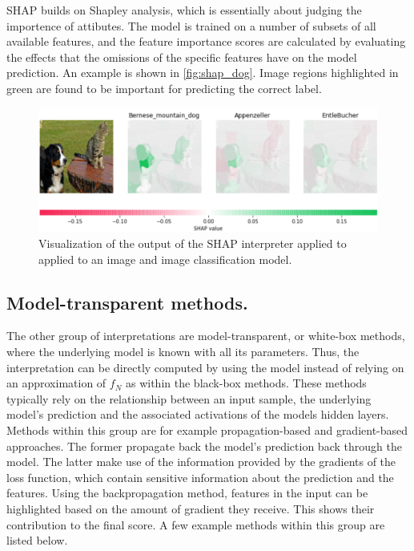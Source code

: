  SHAP \cite{lundberg2017unified} builds on Shapley analysis, which is essentially about judging the importence of attibutes. The model is trained on a number of subsets of all available features, and the feature importance scores are calculated by evaluating the effects that the omissions of the specific features have on the model prediction. An example is shown in \autoref{fig:shap_dog}. Image regions highlighted in green are found to be important for predicting the correct label.

\begin{figure}[ht]
  \centering
  \includegraphics[width=\linewidth]{figures/cat_dog_shap.png}
  \caption{Visualization of the output of the SHAP interpreter applied to applied to an image and image classification model.}\label{fig:shap_dog}
  \vspace{-0.3cm}
\end{figure}


\subsection{Model-transparent methods.}
\label{subsec:wb_methods}

The other group of interpretations are model-transparent, or white-box methods, where the underlying model is known with all its parameters. Thus, the interpretation can be directly computed by using the model instead of relying on an approximation of $f_N$ as within the black-box methods. These methods typically rely on the relationship between an input sample, the underlying model's prediction and the associated activations of the models hidden layers. Methods within this group are for example propagation-based and gradient-based approaches. The former propagate back the model's prediction back through the model. The latter make use of the information provided by the gradients of the loss function, which contain sensitive information about the prediction and the features. Using the backpropagation method, features in the input can be highlighted based on the amount of gradient they receive. This shows their contribution to the final score. 
A few example methods within this group are listed below. 

